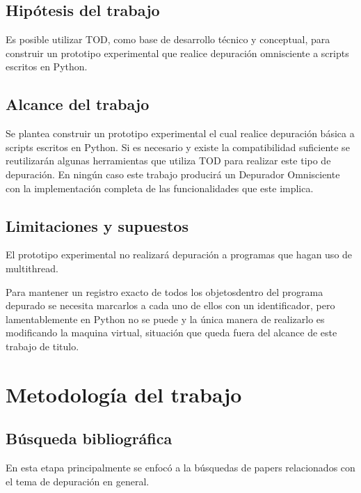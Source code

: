 \documentclass[12pt,a4paper]{report}
\begin{document}
	\section{Hipótesis del trabajo}

    Es posible utilizar TOD, como base de desarrollo técnico y conceptual, para construir un prototipo experimental que realice depuración omnisciente a scripts escritos en Python.

	\section{Alcance del trabajo}

    Se plantea construir un prototipo experimental el cual realice depuración básica a scripts escritos en Python. Si es necesario y existe la compatibilidad suficiente se reutilizarán algunas herramientas que utiliza TOD para realizar este tipo de depuración. En ningún caso este trabajo producirá un Depurador Omnisciente con la implementación completa de las funcionalidades que este implica.

	\section{Limitaciones y supuestos}

El prototipo experimental no realizará depuración a programas que hagan uso de multithread.

    Para mantener un registro exacto de todos los objetos\footnotemark[3] dentro del programa depurado se necesita marcarlos a cada uno de ellos con un identificador, pero lamentablemente en Python no se puede y la única manera de realizarlo es modificando la maquina virtual, situación que queda fuera del alcance de este trabajo de titulo.


\chapter{Metodología del trabajo}
	\section{Búsqueda bibliográfica}

En esta etapa principalmente se enfocó a la búsquedas de papers relacionados con el tema de depuración en general.
\end{document}
